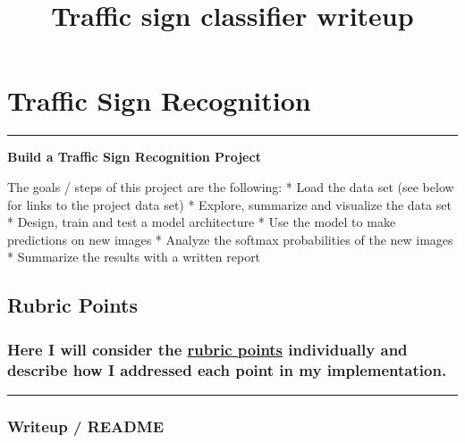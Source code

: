 \documentclass[11pt]{article}
\title{Traffic sign classifier writeup}
\begin{document}
    
    
    \maketitle
    
    

    
    \section{\texorpdfstring{\textbf{Traffic Sign
Recognition}}{Traffic Sign Recognition}}\label{traffic-sign-recognition}

\begin{center}\rule{0.5\linewidth}{\linethickness}\end{center}

\textbf{Build a Traffic Sign Recognition Project}

The goals / steps of this project are the following: * Load the data set
(see below for links to the project data set) * Explore, summarize and
visualize the data set * Design, train and test a model architecture *
Use the model to make predictions on new images * Analyze the softmax
probabilities of the new images * Summarize the results with a written
report

\subsection{Rubric Points}\label{rubric-points}

\subsubsection{\texorpdfstring{Here I will consider the
\href{https://review.udacity.com/\#!/rubrics/481/view}{rubric points}
individually and describe how I addressed each point in my
implementation.}{Here I will consider the rubric points individually and describe how I addressed each point in my implementation.}}\label{here-i-will-consider-the-rubric-points-individually-and-describe-how-i-addressed-each-point-in-my-implementation.}

\begin{center}\rule{0.5\linewidth}{\linethickness}\end{center}

\subsubsection{Writeup / README}\label{writeup-readme}
\end{document}

